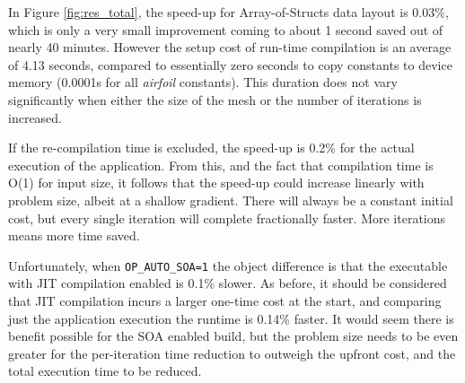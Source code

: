 \noindent In Figure \ref{fig:res_total}, the speed-up for Array-of-Structs data layout is 0.03\%, which is only a very small improvement coming to about 1 second saved out of nearly 40 minutes. However the setup cost of run-time compilation is an average of 4.13 seconds, compared to essentially zero seconds to copy constants to device memory (0.0001s for all \textit{airfoil} constants). This duration does not vary significantly when either the size of the mesh or the number of iterations is increased.
\par
If the re-compilation time is excluded, the speed-up is 0.2\% for the actual execution of the application. From this, and the fact that compilation time is O(1) for input size, it follows that the speed-up could increase linearly with problem size, albeit at a shallow gradient. There will always be a constant initial cost, but every single iteration will complete fractionally faster. More iterations means more time saved.
\par
Unfortunately, when \verb|OP_AUTO_SOA=1| the object difference is that the executable with JIT compilation enabled is 0.1\% slower. As before, it should be considered that JIT compilation incurs a larger one-time cost at the start, and comparing just the application execution the runtime is 0.14\% faster. It would seem there is benefit possible for the SOA enabled build, but the problem size needs to be even greater for the per-iteration time reduction to outweigh the upfront cost, and the total execution time to be reduced.\par

